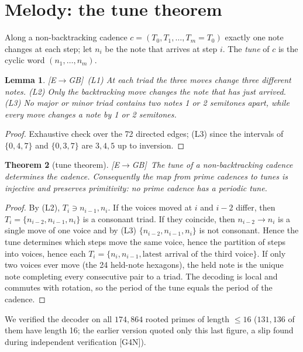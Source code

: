 \documentclass[11pt]{amsart}
\numberwithin{equation}{section}
\theoremstyle{plain}
\newtheorem{theorem}{Theorem}[section]
\newtheorem{lemma}[theorem]{Lemma}
\theoremstyle{definition}\newtheorem{definition}[theorem]{Definition}
\theoremstyle{remark}\newtheorem{remark}[theorem]{Remark}
\newcommand{\ctag}[1]{\textup{\textsf{\scriptsize[#1]}}}
\begin{document}
\section{Melody: the tune theorem}\label{sec:tunemain}
Along a non-backtracking cadence $c=(T_0,T_1,\dots,T_m=T_0)$ exactly one note changes at each step; let $n_i$ be the note that arrives at step $i$. The \emph{tune} of $c$ is the cyclic word $(n_1,\dots,n_m)$.

\begin{lemma}\label{lem:l}
\ctag{E$\to$GB}\ (L1) At each triad the three moves change three different notes. (L2) Only the backtracking move changes the note that has just arrived. (L3) No major or minor triad contains two notes 1 or 2 semitones apart, while every move changes a note by 1 or 2 semitones.
\end{lemma}
\begin{proof}
Exhaustive check over the 72 directed edges; (L3) since the intervals of $\{0,4,7\}$ and $\{0,3,7\}$ are $3,4,5$ up to inversion.
\end{proof}

\begin{theorem}[tune theorem]\label{thm:tune}
\ctag{E$\to$GB}\ The tune of a non-backtracking cadence determines the cadence. Consequently the map from prime cadences to tunes is injective and preserves primitivity: no prime cadence has a periodic tune.
\end{theorem}
\begin{proof}
By (L2), $T_i\ni n_{i-1},n_i$. If the voices moved at $i$ and $i-2$ differ, then $T_i=\{n_{i-2},n_{i-1},n_i\}$ is a consonant triad. If they coincide, then $n_{i-2}\to n_i$ is a single move of one voice and by (L3) $\{n_{i-2},n_{i-1},n_i\}$ is not consonant. Hence the tune determines which steps move the same voice, hence the partition of steps into voices, hence each $T_i=\{n_i,n_{i-1},\text{latest arrival of the third voice}\}$. If only two voices ever move (the 24 held-note hexagons), the held note is the unique note completing every consecutive pair to a triad. The decoding is local and commutes with rotation, so the period of the tune equals the period of the cadence.
\end{proof}
We verified the decoder on all $174{,}864$ rooted primes of length $\le16$ ($131{,}136$ of them have length 16; the earlier version quoted only this last figure, a slip found during independent verification \ctag{G4N}).
\end{document}

